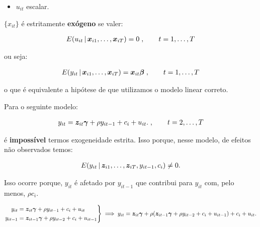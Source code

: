 \documentclass[11pt,oneside,a4paper]{article}
\numberwithin{equation}{section}
\begin{document}
\begin{description}
\begin{description}
\begin{itemize}
\item
$u_{it}$ escalar.
\end{itemize}

\noindent
$\{x_{it}\}$ é estritamente \textbf{exógeno} se valer:

\vspace{-1 em}
\begin{align*}
	E( u_{it} \, | \, \boldsymbol{x}_{i1}, \dots, \boldsymbol{x}_{iT} ) = 0 \; , \qquad t = 1, \dots, T
\end{align*}

\noindent
ou seja:

\vspace{-1 em}
\begin{align*}
E( y_{it} \, | \, \boldsymbol{x}_{i1}, \dots, \boldsymbol{x}_{iT} ) = \boldsymbol{x}_{it} \boldsymbol{\beta} 
\; , \qquad t = 1, \dots, T
\end{align*}

\noindent
o que é equivalente a hipótese de que utilizamos o modelo linear correto.

Para o seguinte modelo:

\vspace{-1.5 em}
\begin{align*}
y_{it} = \boldsymbol{z}_{it} \boldsymbol{\gamma} + \rho y_{i t - 1} + c_{i} + u_{it}.
\; , \qquad t = 2, \dots, T
\end{align*}

\noindent
é \textbf{impossível} termos exogeneidade estrita.
Isso porque, nesse modelo, de efeitos não observados temos:

\vspace{-1.5 em}
\begin{align*}
	E( y_{it} \, | \, \boldsymbol{z}_{i1}, \dots, \boldsymbol{z}_{iT}, y_{it-1}, c_{i}) \neq 0.
\end{align*}

\noindent
Isso ocorre porque, $y_{it}$ é afetado por $y_{it-1}$ que contribui para $y_{it}$ com, pelo menos, $\rho c_{i}$.

\begin{equation*}
\left.
\begin{aligned}
y_{it} &= \boldsymbol{z}_{it} \boldsymbol{\gamma} + \rho y_{i t - 1} + c_{i} + u_{it}
\\
y_{it-1} &= \boldsymbol{z}_{it-1} \boldsymbol{\gamma} + \rho y_{i t - 2} + c_{i} + u_{it-1}
\end{aligned}
\right\} 
\implies
y_{it} = \boldsymbol{z}_{it} \boldsymbol{\gamma} +
\rho (\boldsymbol{z}_{it-1} \boldsymbol{\gamma} + \rho y_{i t - 2} + c_{i} + u_{it-1})
+ c_{i} + u_{it}.
\end{equation*}


\end{description}
\end{description}
\end{document}
